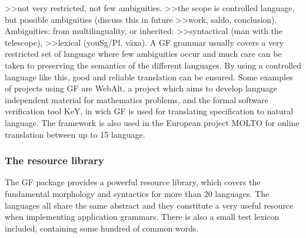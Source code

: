 \documentclass{report}
\begin{document}
>>not very restricted, not few ambiguities.
>>the scope is controlled language, but possible ambiguities (discuss this in future
>>work, saldo, conclusion). Ambiguities: from multilinguality, or inherited:
>>syntactical (man with the telescope), 
>>lexical (youSg/Pl, växa).
A GF grammar usually covers a very restricted set of language where few ambiguities
occur and much care can be taken to preserving the semantics of the
different languages.
By using a controlled language like this,  good and reliable translation can be
ensured. Some examples of projects using GF are WebAlt\cite{webalt},
a project which aims to develop language independent material for mathematics problems,
and the formal software verification tool KeY\cite{key}, in wich GF is used for
translating specification to natural language.
The framework is also used in the
European project MOLTO\cite{molto} for online translation between up to 15 language.\\

\subsubsection{The resource library}
The GF package provides a powerful resource library\cite{gf-resource}, which covers the
fundamental morphology and syntactics for more than 20 languages. %
The languages all share the same abstract and they constitute  
a very useful resource when implementing application grammars.
There is also a small test lexicon included, containing some hundred of common
words.
\end{document}
